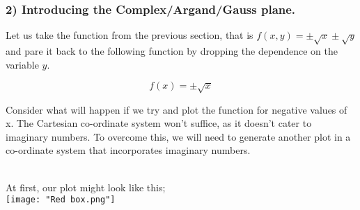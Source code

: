 

%
%

\begin{frame}
\frametitle{2) Introducing the Complex/Argand/Gauss plane.}

Let us take the function from the previous section, that is \(f(x,y) = \pm\sqrt{x} \pm\sqrt{y}\) and pare it back to the following function by dropping the 
dependence on the variable \(y\).

\begin{equation}
  f(x) = \pm\sqrt{x}
\end{equation}

Consider what will happen if we try and plot the function for negative values of x. The Cartesian co-ordinate system won't suffice, as it doesn't cater to
imaginary numbers. To overcome this, we will need to generate another plot in a co-ordinate system that incorporates imaginary numbers.\\~\

\end{frame}


%
%

\begin{frame}

At first, our plot might look like this;\\

\texttt{[image: "Red box.png"]}

\end{frame}